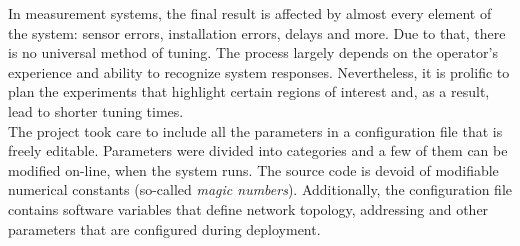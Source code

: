 In measurement systems, the final result is affected by almost every element of the system: sensor errors, installation errors, delays and more. Due to that, there is no universal method of tuning. The process largely depends on the operator's experience and ability to recognize system responses. Nevertheless, it is prolific to plan the experiments that highlight certain regions of interest and, as a result, lead to shorter tuning times.\\

The project took care to include all the parameters in a configuration file that is freely editable. Parameters were divided into categories and a few of them can be modified on-line, when the system runs. The source code is devoid of modifiable numerical constants (so-called \textit{magic numbers}). Additionally, the configuration file contains software variables that define network topology, addressing and other parameters that are configured during deployment.

